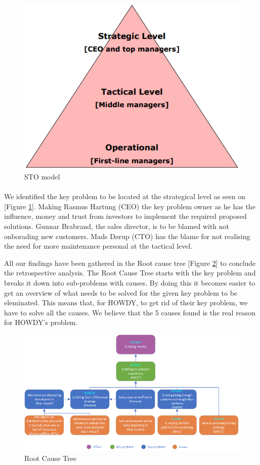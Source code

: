 \begin{figure}
\centering
\includegraphics[scale=0.3]{figures/strategicallevel.png}
\caption{STO model}
\label{stomodel}
\end{figure}
\paragraph{}

We identified the key problem to be located at the strategical level as seen on [Figure \ref{stomodel}]. Making Rasmus Hartung (CEO) the key problem owner as he has the influence, money and trust from investors to implement the required proposed solutions. Gunnar Brabrand, the sales director, is to be blamed with not onborading new customers. Mads Dørup (CTO) has the blame for not realising the need for more maintenance personal at the tactical level.\newline


\noindent All our findings have been gathered in the Root cause tree [Figure \ref{rootcausetree}] to conclude the retrospective analysis. The Root Cause Tree starts with the key problem and breaks it down into sub-problems with causes. By doing this it becomes easier to get an overview of what needs to be solved for the given key problem to be eleminated. This means that, for HOWDY, to get rid of their key problem, we have to solve all the causes. We believe that the 5 causes found is the real reason for HOWDY's problem.

\begin{figure}[H]
\centering
\includegraphics[scale=0.73]{figures/rootcause.png}
\caption{Root Cause Tree}
\label{rootcausetree}
\end{figure}
